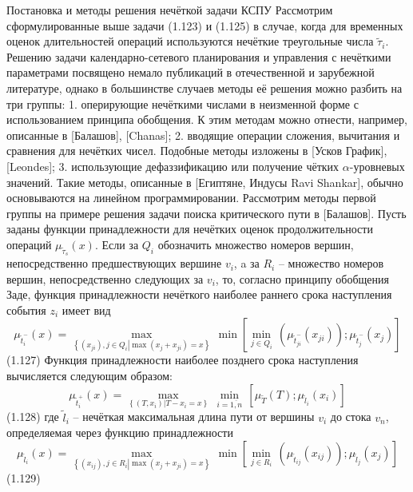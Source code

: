 Постановка и методы решения нечёткой задачи КСПУ
Рассмотрим сформулированные выше задачи (1.123) и (1.125) в случае, когда для временных оценок длительностей операций используются нечёткие треугольные числа ${{\tilde{\tau }}_{i}}$. Решению задачи календарно-сетевого планирования и управления с нечёткими параметрами посвящено немало публикаций в отечественной и зарубежной литературе, однако в большинстве случаев методы её решения можно разбить на три группы:
1.	оперирующие нечёткими числами в неизменной форме с использованием принципа обобщения. К этим методам можно отнести, например, описанные в [Балашов], [Chanas];
2.	вводящие операции сложения, вычитания и сравнения для нечётких чисел. Подобные методы изложены в [Усков График], [Leondes];
3.	использующие дефаззификацию или получение чётких $\alpha$-уровневых значений. Такие методы, описанные в [Египтяне, Индусы Ravi Shankar], обычно основываются на линейном программировании.
Рассмотрим методы первой группы на примере решения задачи поиска критического пути в [Балашов]. Пусть заданы функции принадлежности для нечётких оценок продолжительности операций ${{\mu }_{{{{\tilde{\tau }}}_{s}}}}\left( x \right)$. Если за ${{Q}_{i}}$ обозначить множество номеров вершин, непосредственно предшествующих вершине ${{v}_{i}}$, a за ${{R}_{i}}$ – множество номеров вершин, непосредственно следующих за ${{v}_{i}}$, то, согласно принципу обобщения Заде, функция принадлежности нечёткого наиболее раннего срока наступления события ${{z}_{i}}$ имеет вид
	\[{{\mu }_{\tilde{t}_{i}^{-}}}\left( x \right)=\underset{\left\{ \left( {{x}_{ji}} \right),j\in {{Q}_{i}}\left| \max \left( {{x}_{j}}+{{x}_{ji}} \right)=x \right. \right\}}{\mathop{\max }}\,\min \left[ \underset{j\in {{Q}_{i}}}{\mathop{\min }}\,\left( {{\mu }_{\tilde{t}_{ji}^{-}}}\left( {{x}_{ji}} \right) \right);{{\mu }_{\tilde{t}_{j}^{-}}}\left( {{x}_{j}} \right) \right]\] 	(1.127)
Функция принадлежности наиболее позднего срока наступления вычисляется следующим образом: 
	\[{{\mu }_{\tilde{t}_{i}^{+}}}\left( x \right)=\underset{\left\{ \left( T,{{x}_{i}} \right)\left| T-{{x}_{i}}=x \right. \right\}}{\mathop{\max }}\,\underset{i=\overline{1,n}}{\mathop{\min }}\,\left[ {{\mu }_{{\tilde{T}}}}\left( T \right);{{\mu }_{{{{\tilde{l}}}_{i}}}}\left( {{x}_{i}} \right) \right]\] 	(1.128)
где $\tilde l_i$ – нечёткая максимальная длина пути от вершины ${{v}_{i}}$ до стока ${{v}_{n}}$, определяемая через функцию принадлежности
	\[{{\mu }_{{{{\tilde{l}}}_{i}}}}\left( x \right)=\underset{\left\{ \left( {{x}_{ij}} \right),j\in {{R}_{i}}\left| \max \left( {{x}_{j}}+{{x}_{ji}} \right)=x \right. \right\}}{\mathop{\max }}\,\min \left[ \underset{j\in {{R}_{i}}}{\mathop{\min }}\,\left( {{\mu }_{{{{\tilde{t}}}_{ij}}}}\left( {{x}_{ij}} \right) \right);{{\mu }_{{{{\tilde{l}}}_{j}}}}\left( {{x}_{j}} \right) \right]\] 	(1.129)

